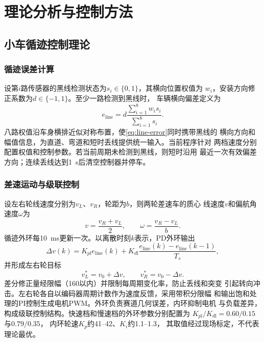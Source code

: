 \section{理论分析与控制方法}

\subsection{小车循迹控制理论}

\subsubsection{循迹误差计算}

设第$i$路传感器的黑线检测状态为$s_i\in\{0,1\}$，其横向位置权值为
$w_i$，安装方向修正系数为$d\in\{-1,1\}$。至少一路检测到黑线时，
车辆横向偏差定义为
\begin{equation}
  e_{\mathrm{line}}
  =d\frac{\sum_{i=1}^{8}w_i s_i}{\sum_{i=1}^{8}s_i}.
  \label{eq:line-error}
\end{equation}
八路权值沿车身横排近似对称布置，使\eqref{eq:line-error}同时携带黑线的
横向方向和幅值信息，为直道、弯道和短时丢线提供统一输入。当前程序针对
两档速度分别配置权值和控制参数。若当前周期未检测到黑线，则短时沿用
最近一次有效偏差方向；连续丢线达到\SI{1}{s}后清空控制器并停车。

\subsubsection{差速运动与级联控制}

设左右轮线速度分别为$v_L$、$v_R$，轮距为$b$，则两轮差速车的质心
线速度$v$和偏航角速度$\omega$为
\begin{equation}
  v=\frac{v_R+v_L}{2},\qquad
  \omega=\frac{v_R-v_L}{b}.
  \label{eq:diff-drive}
\end{equation}
循迹外环每\SI{10}{ms}更新一次。以离散时刻$k$表示，PD外环输出
\begin{equation}
  \Delta v(k)=K_{p\mathrm{l}}e_{\mathrm{line}}(k)
  +K_{d\mathrm{l}}\frac{e_{\mathrm{line}}(k)-e_{\mathrm{line}}(k-1)}{T_s},
  \label{eq:line-pd}
\end{equation}
并形成左右轮目标
\begin{equation}
  v_L^\ast=v_0+\Delta v,\qquad
  v_R^\ast=v_0-\Delta v.
  \label{eq:wheel-target}
\end{equation}
差分修正量经限幅（\SI{160}{}以内）并限制每周期变化率，防止丢线和突变
引起转向冲击。左右轮各自以编码器周期计数作为速度反馈，采用带积分限幅
和输出饱和处理的PI控制生成电机PWM。外环负责赛道几何误差，内环抑制电机
与负载差异，构成级联控制结构。快速档和慢速档的外环参数分别配置为
$K_{p\mathrm{l}}/K_{d\mathrm{l}}=0.60/0.15$与$0.79/0.35$，
内环轮速$K_p$约\SIrange{41}{42}{}、$K_i$约\SIrange{1.1}{1.3}{}，
其取值经过现场标定，不代表理论最优。

